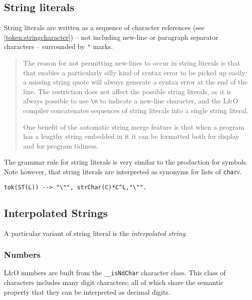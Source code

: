 \subsection{String literals}
\label{token:string}

String literals are written as a sequence of character references (see \ref{token:stringcharacter}) -- not including new-line or paragraph separator characters -- surrounded by \verb+"+ marks.

\begin{quote}
The reason for not permitting new-lines to occur in string literals is that that enables a particularly silly kind of syntax error to be picked up easily: a missing string quote will always generate a syntax error at the end of the line. The restriction does not affect the possible string literals, as it is always possible to use \verb+\n+ to indicate a new-line character, and the L&O compiler concatenates sequences of string literals into a single string literal.

One benefit of the automatic string merge feature is that when a program has a lengthy string embedded in it it can be formatted both for display and for program tidiness.
\end{quote}

The grammar rule for string literals is very similar to the production for symbols. Note however, that string literals are interpreted as synonyms for lists of \verb+char+s.

\begin{verbatim}
tok(ST(L)) --> "\"", strChar(C)*C^L,"\"".
\end{verbatim}

\subsection{Interpolated Strings}

A particular variant of string literal is the \emph{interpolated string}.

\subsubsection{Numbers}
\label{token:number}

L&O numbers are built from the \verb+__isNdChar+ character class. This class of characters includes many digit characters; all of which share the semantic property that they can be interpreted as decimal digits.

